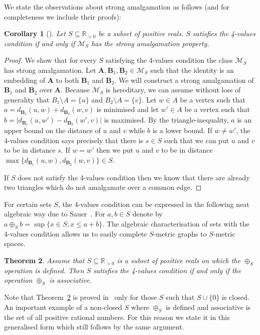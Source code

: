 \documentclass{elsarticle}
\def\str#1{\mathbf {#1}}
\theoremstyle{plain}
\newtheorem{theorem}{Theorem}[section]
\newtheorem{corollary}[theorem]{Corollary}
\theoremstyle{definition}
\theoremstyle{remark}
\begin{document}
We state the observations about strong amalgamation as follows (and for completeness we include their proofs):
\begin{corollary}[\cite{Sauer2013}]
\label{cor:sauer2}
Let $S\subseteq \mathbb R_{>0}$ be a subset of positive reals. $S$ satisfies the 4-values condition if and only if $\mathcal M_S$ has the strong amalgamation property.
\end{corollary}
\begin{proof}
We show that for every $S$ satisfying the 4-values condition the class $\mathcal M_S$ has strong amalgamation.
Let $\str{A},\str{B}_1,\str{B}_2\in \mathcal M_S$ such that the identity is
an embedding of $\str{A}$ to both $\str{B}_1$ and $\str{B}_2$. We will construct
a strong amalgamation of $\str{B}_1$ and $\str{B}_2$  over $\str{A}$.
Because $\mathcal M_S$ is hereditary, we can assume without loss of generality
that $B_1\setminus A=\{u\}$ and $B_2\setminus A=\{v\}$. Let $w\in A$ be a vertex such
that $a=d_{\str{B}_1}(u,w) + d_{\str{B}_2}(w,v)$ is minimised and let $w'\in A$ be a vertex
such that $b=\vert d_{\str{B}_1}(u,w')-d_{\str{B}_2}(w',v)\vert $ is maximised. By the triangle-inequality, $a$ is an upper
bound on the distance of $u$ and $v$ while $b$ is a lower bound.
If $w\neq w'$, the  4-values condition says precisely that there is $s\in S$ such that we can put $u$ and $v$ to be in distance $s$. If
$w=w'$ then we put $u$ and $v$ to be in distance $\max \{d_{\str{B}_1}(u,w), d_{\str{B}_2}(w,v)\}\in S$.

If $S$ does not satisfy the 4-values condition then we know that there are already two triangles which do not amalgamate over a common edge.
\end{proof}
For certain sets $S$, the 4-values condition can be expressed in the following neat algebraic way due to Sauer~\cite{Sauer2013b}.
For $a,b\in S$ denote by $a\oplus_S b=\sup\{x\in S; x\leq a+b\}$.
The algebraic characterisation of sets with the 4-values
condition allows us to easily complete $S$-metric graphs to $S$-metric spaces.
\begin{theorem}
\label{thm:sauer2}
Assume that $S\subseteq \mathbb R_{>0}$ is a subset of positive reals on which the $\oplus_S$ operation is defined.
Then $S$ satisfies the 4-values condition if and only if the operation $\oplus_S$
is associative.
\end{theorem}
Note that Theorem~\ref{thm:sauer2} is proved in~\cite{Sauer2013b} only for those $S$ such that $S\cup\{0\}$ is closed. An important example of a non-closed $S$ where $\oplus_S$ is defined and associative is the set of all positive rational numbers. For this reason we state it in this generalised form which still follows by the same argument.
\end{document}
